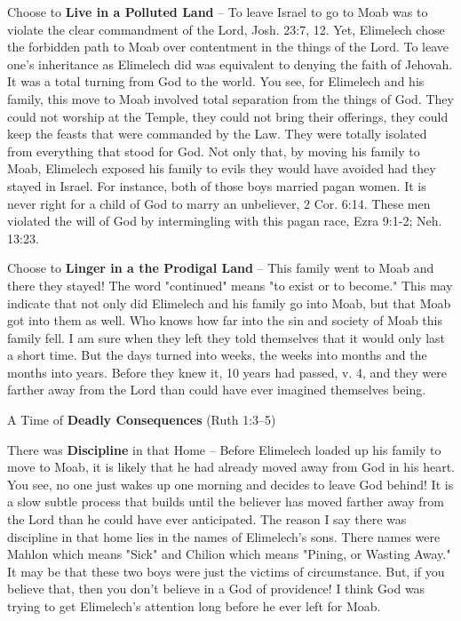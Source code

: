 \begin{compactenum}[I.][7]
\begin{compactenum}[A.][7]
    	\item Choose to \textbf{Live in a Polluted Land} -- To leave Israel to go to Moab was to violate the clear commandment of the Lord, Josh. 23:7, 12. Yet, Elimelech chose the forbidden path to Moab over contentment in the things of the Lord. To leave one's inheritance as Elimelech did was equivalent to denying the faith of Jehovah. It was a total turning from God to the world. You see, for Elimelech and his family, this move to Moab involved total separation from the things of God. They could not worship at the Temple, they could not bring their offerings, they could keep the feasts that were commanded by the Law. They were totally isolated from everything that stood for God. Not only that, by moving his family to Moab, Elimelech exposed his family to evils they would have avoided had they stayed in Israel. For instance, both of those boys married pagan women. It is never right for a child of God to marry an unbeliever, 2 Cor. 6:14. These men violated the will of God by intermingling with this pagan race, Ezra 9:1-2; Neh. 13:23.
    	\item Choose to \textbf{Linger in a the Prodigal Land} -- This family went to Moab and there they stayed! The word "continued" means "to exist or to become." This may indicate that not only did Elimelech and his family go into Moab, but that Moab got into them as well. Who knows how far into the sin and society of Moab this family fell. I am sure when they left they told themselves that it would only last a short time. But the days turned into weeks, the weeks into months and the months into years. Before they knew it, 10 years had passed, v. 4, and they were farther away from the Lord than could have ever imagined themselves being.
    \end{compactenum}
     \item A Time of \textbf{Deadly Consequences} (Ruth 1:3--5)
    \begin{compactenum}[A.][7]
    	\item There was \textbf{Discipline} in that Home -- Before Elimelech loaded up his family to move to Moab, it is likely that he had already moved away from God in his heart. You see, no one just wakes up one morning and decides to leave God behind! It is a slow subtle process that builds until the believer has moved farther away from the Lord than he could have ever anticipated. The reason I say there was discipline in that home lies in the names of Elimelech's sons. There names were Mahlon which means "Sick" and Chilion which means "Pining, or Wasting Away." It may be that these two boys were just the victims of circumstance. But, if you believe that, then you don't believe in a God of providence! I think God was trying to get Elimelech's attention long before he ever left for Moab.

\end{compactenum}
\end{compactenum}
